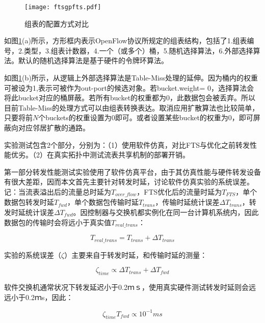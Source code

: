 \begin{figure}[!ht]
	\centering 
	\vspace{-1.5mm} 
	\texttt{[image: ftsgpfts.pdf]}
	\caption{组表的配置方式对比} \label{fig:ftsgpfts}
\end{figure}

如图\ref{fig:ftsgpfts}(a)所示，方形框内表示OpenFlow协议所规定的组表结构，包括了1.组表编号，2.类型，3.组表计数器，4.一个（或多个）桶，5.随机选择算法，6.外部选择算法。默认的随机选择算法是基于硬件的令牌环算法。

如图\ref{fig:ftsgpfts}(b)所示，从逻辑上外部选择算法是Table-Miss处理的延伸。因为桶内的权重可被设为1,表示可被作为out-port的候选对象。若bucket.weight= 0，选择算法会将此bucket对应的桶屏蔽。若所有bucket的权重都为0，此数据包会被丢弃。所以目前Table-Miss的处理方式可以由组表转换表达。取消应用扩散算法也比较简单，只要将前$ N $个buckets的权重设置为0即可。或者设置某些bucket的权重为0，即可屏蔽向对应邻居扩散的通路。





\label{chapftsevaluation}

实验测试包含2个部分，分别为：（1）使用软件仿真，对比FTS与优化之前转发性能优劣。（2）在真实拓扑中测试流表共享机制的部署开销。

第一部分转发性能测试实验使用了软件仿真平台，由于其仿真性能与硬件转发设备有很大差距，因而本文首先主要针对转发时延，讨论软件仿真实验的系统误差。记：当流表溢出后的流量总时延为$T_{over\_flow}$，FTS优化后的流量时延为$T_{FTS}$，单个数据包转发时延$T_{fwd}$，单个数据包传输时延$T_{trans}$，传输时延统计误差$\Delta T_{trans}$，转发时延统计误差$\Delta T_{fwd}$。因控制器与交换机都实例化在同一台计算机系统内，因此数据包的传输时会将远小于真实值$T_{real\_trans}$：

\begin{equation}\label{fts7}
T_{real\_trans} = T_{trans} + \Delta T_{trans}
\end{equation}

实验的系统误差（$\zeta$）主要来自于转发时延，和传输时延的测量：

\begin{equation}\label{fts8}
\zeta_{time} \propto \Delta T_{trans} + \Delta T_{fwd}
\end{equation}

软件交换机通常状况下转发延迟小于0.2ｍｓ，使用真实硬件测试转发时延则会远远小于0.2ｍs，因此：

\begin{equation}\label{fts9}
\zeta_{time} T_{fwd} \propto 10^{-1}ms
\end{equation}

